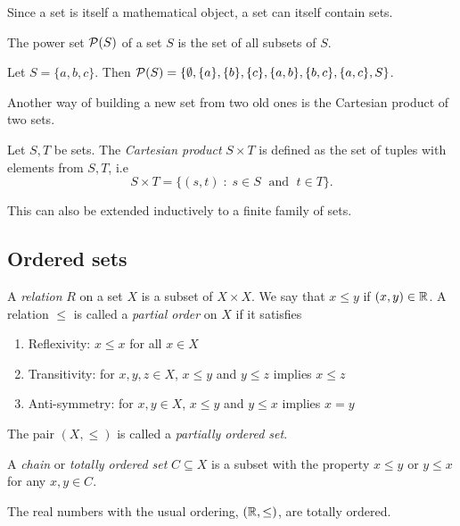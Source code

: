 \documentclass{article}
\begin{document}
Since a set is itself a mathematical object, a set can itself contain sets.
\begin{definition}
The power set $\mathcal{P}(S)$ of a set $S$ is the set of all subsets of $S$.
\end{definition}

\begin{example}
Let $S = \{a,b,c\}$. Then $\mathcal{P}(S) = \{ \emptyset, \{a\}, \{b\}, \{c\}, \{a,b\},\{b,c\}, \{a,c\}, S \}$. 
\end{example}

Another way of building a new set from two old ones is the Cartesian product of two sets.

\begin{definition}\label{def:cartes_prod}
Let $S,T$ be sets. The \emph{Cartesian product} $S\times T$ is defined as the set of tuples with elements from $S,T$, i.e 
\begin{equation*}
    S\times T = \{ (s,t) \; \colon \; s \in S \; \text{ and } \; t \in T\}.
\end{equation*}
\end{definition}

This can also be extended inductively to a finite family of sets. 

\subsection{Ordered sets}\label{sec:ordered_sets}

\begin{definition}
A \emph{relation} $R$ on a set $X$ is a subset of $X \times X$. We say that $x \leq y$ if $(x,y)\in {\mathbb{R}}$. A relation $\leq$ is called a \emph{partial order} on $X$ if it satisfies
\begin{enumerate}
\item Reflexivity: $x \leq x$ for all $x \in X$
\item Transitivity: for $x,y,z \in X$, $x \leq y$ and $y \leq z$ implies $x \leq z$
\item Anti-symmetry: for $x,y \in X$, $x \leq y$ and $y \leq x$ implies $x = y$
\end{enumerate}
The pair $(X, \leq)$ is called a \emph{partially ordered set}.

A \emph{chain} or \emph{totally ordered set} $C \subseteq X$ is a subset with the property $x \leq y$ or $y \leq x$ for any $x,y \in C$.
\end{definition}


\begin{example}
The real numbers with the usual ordering, $({\mathbb{R}}, \leq)$, are totally ordered. 
\end{example}
\end{document}
